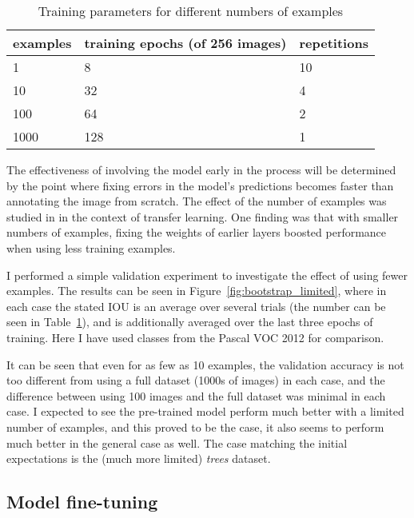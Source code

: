 \begin{table}[bht!]
  \centering
 
  \begin{tabular}{ l  l  l}
    examples & training epochs (of 256 images) & repetitions \\
    \toprule
    1       & 8     & 10 \\
    10       & 32     & 4  \\
    100   & 64     & 2 \\
    1000  & 128 & 1 \\
    \bottomrule
  \end{tabular}
  
  \caption{Training parameters for different numbers of examples}
   \label{tab:bootstrap_limit_params}

\end{table}





The effectiveness of involving the model early in the process will be determined by the point where fixing errors in the model's predictions becomes faster than annotating the image from scratch. The effect of the number of examples was studied in \cite{Soekhoe} in the context of transfer learning. One finding was that with smaller numbers of examples, fixing the weights of earlier layers boosted performance when using less training examples.

I performed a simple validation experiment to investigate the effect of using fewer examples. The results can be seen in Figure~\ref{fig:bootstrap_limited}, where in each case the stated IOU is an average over several trials (the number can be seen in Table~\ref{tab:bootstrap_limit_params}), and is additionally averaged over the last three epochs of training. Here I have used classes from the Pascal VOC 2012 for comparison.

It can be seen that even for as few as 10 examples, the validation accuracy is not too different from using a full dataset (1000s of images) in each case, and the difference between using 100 images and the full dataset was minimal in each case. I expected to see the pre-trained model perform much better with a limited number of examples, and this proved to be the case,  it also seems to perform much better in the general case as well. The case matching the initial expectations is the (much more limited) \emph{trees} dataset.



\subsection{Model fine-tuning}

